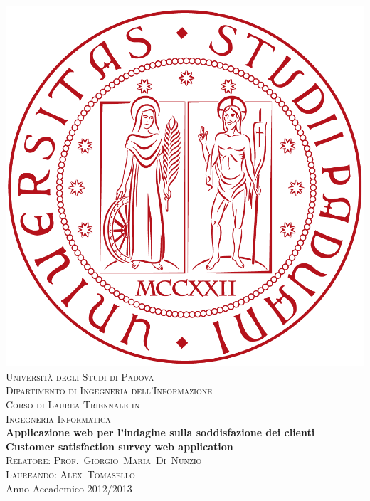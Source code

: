 



\begin{titlepage}
\begin{center}
\includegraphics[scale=0.08]{icons/logo.png}\\[1.5cm]
\textsc{\LARGE Università degli Studi di Padova}\\[1.2cm]
\textsc{\Large Dipartimento di Ingegneria dell'Informazione}\\[0.8cm]
\textsc{\Large Corso di Laurea Triennale in}\\[0.5cm]
\textsc{\Large Ingegneria Informatica}\\[2cm]
{ \LARGE \bfseries Applicazione web per l'indagine sulla soddisfazione dei
clienti}\\[1cm]
{  \bfseries Customer satisfaction survey web application}\\[2cm] 
\textsc{\large Relatore: Prof.~Giorgio~Maria~Di~Nunzio}\\[0.5cm]
\textsc{\large Laureando: Alex~Tomasello}\\
\vfill
{\large Anno Accademico 2012/2013}
\end{center}
\end{titlepage}



